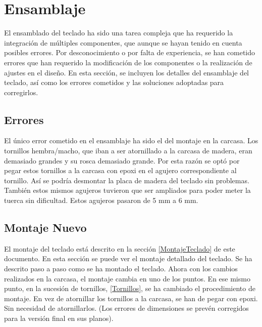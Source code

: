 \section{Ensamblaje}\label{ApendiceEnsamblaje}

El ensamblado del teclado ha sido una tarea compleja que ha requerido la integración de múltiples componentes, que aunque se hayan tenido en cuenta posibles errores. Por desconocimiento o por falta de experiencia, se han cometido errores que han requerido la modificación de los componentes o la realización de ajustes en el diseño. En esta sección, se incluyen los detalles del ensamblaje del teclado, así como los errores cometidos y las soluciones adoptadas para corregirlos.

\subsection{Errores}\label{ApendiceEnsamblajeErrores}

El único error cometido en el ensamblaje ha sido el del montaje en la carcasa. Los tornillos hembra/macho, que iban a ser atornillado a la carcasa de madera, eran demasiado grandes y su rosca demasiado grande. Por esta razón se optó por pegar estos tornillos a la carcasa con epoxi en el agujero correspondiente al tornillo. Así se podría desmontar la placa de madera del teclado sin problemas. También estos mismos agujeros tuvieron que ser ampliados para poder meter la tuerca sin dificultad. Estos agujeros pasaron de 5 mm a 6 mm.

\subsection{Montaje Nuevo} \label{ApendiceEnsamblajeMontaje}

El montaje del teclado está descrito en la sección \ref{MontajeTeclado} de este documento. En esta sección se puede ver el montaje detallado del teclado. Se ha descrito paso a paso como se ha montado el teclado. Ahora con los cambios realizados en la carcasa, el montaje cambia en uno de los puntos. En ese mismo punto, en la sucesión de tornillos, \ref{Tornillos}, se ha cambiado el procedimiento de montaje. En vez de atornillar los tornillos a la carcasa, se han de pegar con epoxi. Sin necesidad de atornillarlos. (Los errores de dimensiones se prevén corregidos para la versión final en sus planos).